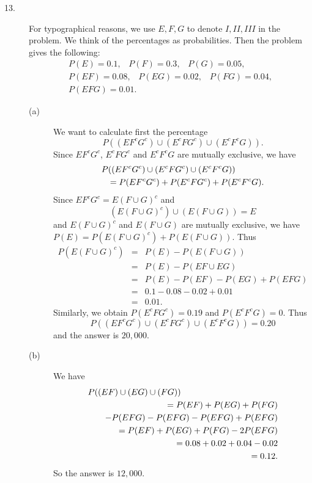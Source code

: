 \begin{description}

\item[{\rm 13.}] For typographical reasons, we use $E, F, G$ to denote
$I, II, III$ in the problem. We think of the percentages as 
probabilities. Then the problem gives the following: 
\begin{eqnarray*}
&P(E)=0.1,\; \;\; P(F)=0.3,\;\;\; P(G)=0.05,&\\
&P(EF)=0.08,\;\;\;P(EG)=0.02,\;\;\; P(FG)=0.04,&\\
&P(EFG)=0.01.&
\end{eqnarray*}

\begin{description}

\item[(a)] We want to calculate first the percentage
$$P((EF^{c}G^{c})\cup (E^{c}FG^{c})\cup (E^{c}F^{c}G)).$$
Since $EF^{c}G^{c}$, $E^{c}FG^{c}$ and $E^{c}F^{c}G$ are 
mutually exclusive, we have 
\begin{eqnarray*}
\lefteqn{P((EF^{c}G^{c})\cup (E^{c}FG^{c})\cup (E^{c}F^{c}G))}\\
&&=P(EF^{c}G^{c})+P(E^{c}FG^{c})+P(E^{c}F^{c}G).
\end{eqnarray*}
Since $EF^{c}G^{c}=E(F\cup G)^{c}$ and 
$$(E(F\cup G)^{c})\cup (E(F\cup G))=E$$
and $E(F\cup G)^{c}$ and $E(F\cup G)$ are mutually exclusive,
we have $P(E)=P(E(F\cup G)^{c})+P(E(F\cup G))$. Thus
\begin{eqnarray*}
P(E(F\cup G)^{c})&=&P(E)-P(E(F\cup G))\\
&=&P(E)-P(EF\cup EG)\\
&=&P(E)-P(EF)-P(EG)+P(EFG)\\
&=&0.1-0.08-0.02+0.01\\
&=&0.01.
\end{eqnarray*}
Similarly, we obtain $P(E^{c}FG^{c})=0.19$ and $P(E^{c}F^{c}G)=0$.
Thus 
$$P((EF^{c}G^{c})\cup (E^{c}FG^{c})\cup (E^{c}F^{c}G))=0.20$$
and the answer is $20,000$. 

\item[(b)] We have 
\begin{eqnarray*}
\lefteqn{P((EF)\cup (EG)\cup (FG))}\\
&&=P(EF)+P(EG)+P(FG)\\
&&\quad -P(EFG)-P(EFG)-P(EFG)+P(EFG)\\
&&=P(EF)+P(EG)+P(FG)-2P(EFG)\\
&&=0.08+0.02+0.04-0.02\\
&&=0.12.
\end{eqnarray*}
So the answer is $12,000$.


\end{description}
\end{description}
